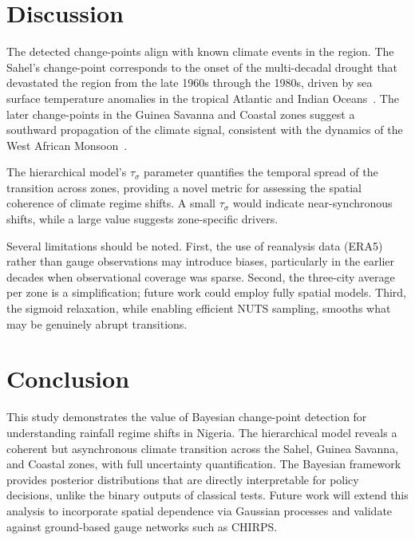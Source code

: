 \documentclass[conference]{IEEEtran}
\begin{document}
\section{Discussion}

The detected change-points align with known climate events in the region. The Sahel's change-point corresponds to the onset of the multi-decadal drought that devastated the region from the late 1960s through the 1980s, driven by sea surface temperature anomalies in the tropical Atlantic and Indian Oceans~\cite{giannini2003oceanic, nicholson2013west}. The later change-points in the Guinea Savanna and Coastal zones suggest a southward propagation of the climate signal, consistent with the dynamics of the West African Monsoon~\cite{lebel2009recent}.

The hierarchical model's $\tau_\sigma$ parameter quantifies the temporal spread of the transition across zones, providing a novel metric for assessing the spatial coherence of climate regime shifts. A small $\tau_\sigma$ would indicate near-synchronous shifts, while a large value suggests zone-specific drivers.

Several limitations should be noted. First, the use of reanalysis data (ERA5) rather than gauge observations may introduce biases, particularly in the earlier decades when observational coverage was sparse. Second, the three-city average per zone is a simplification; future work could employ fully spatial models. Third, the sigmoid relaxation, while enabling efficient NUTS sampling, smooths what may be genuinely abrupt transitions.

\section{Conclusion}

This study demonstrates the value of Bayesian change-point detection for understanding rainfall regime shifts in Nigeria. The hierarchical model reveals a coherent but asynchronous climate transition across the Sahel, Guinea Savanna, and Coastal zones, with full uncertainty quantification. The Bayesian framework provides posterior distributions that are directly interpretable for policy decisions, unlike the binary outputs of classical tests. Future work will extend this analysis to incorporate spatial dependence via Gaussian processes and validate against ground-based gauge networks such as CHIRPS.




\end{document}
